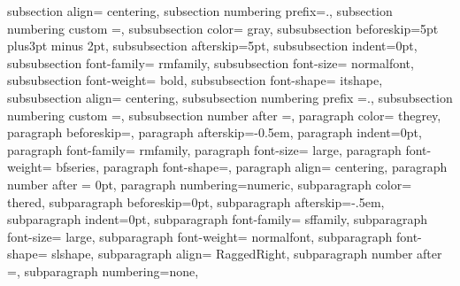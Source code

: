 {{       subsection align= centering,
       subsection numbering prefix=\thesection.,%
       subsection numbering custom =\@arabic\c@subsection,%
       subsubsection color= gray,
       subsubsection beforeskip=5pt plus3pt minus 2pt,
       subsubsection afterskip=5pt,
       subsubsection indent=0pt,
       subsubsection font-family= rmfamily,
       subsubsection font-size= normalfont,
       subsubsection font-weight= bold,
       subsubsection font-shape= itshape,
       subsubsection align= centering,
       subsubsection numbering prefix =\thesubsection.\@arabic\c@subsubsection,
       subsubsection numbering custom =, %
       subsubsection number after =, 
%
       paragraph color= thegrey,
       paragraph beforeskip=,
       paragraph afterskip=-0.5em,
       paragraph indent=0pt,
       paragraph font-family= rmfamily,
       paragraph font-size= large,
       paragraph font-weight= bfseries,
       paragraph font-shape=,
       paragraph align= centering,
       paragraph number after = 0pt,
       paragraph numbering=numeric,
       subparagraph color= thered,
       subparagraph beforeskip=0pt,
       subparagraph afterskip=-.5em,
       subparagraph indent=0pt,
       subparagraph font-family= sffamily,
       subparagraph font-size= large,
       subparagraph font-weight= normalfont,
       subparagraph font-shape= slshape,
       subparagraph align= RaggedRight,
       subparagraph number after =, %
       subparagraph numbering=none,
}
}

\renewparagraph
\renewsection
\renewsubsection
\renewsubparagraph
\renewsubsubsection

\makeatother